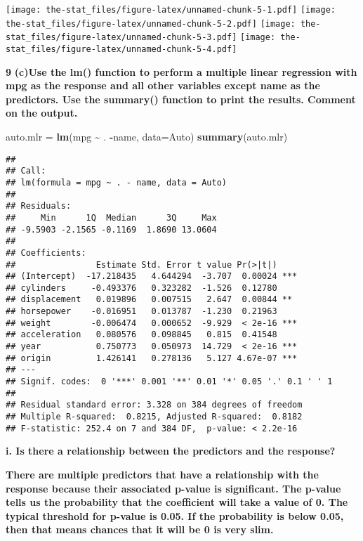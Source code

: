 \documentclass[
]{article}
\newenvironment{Shaded}{\begin{snugshade}}{\end{snugshade}}
\newcommand{\AttributeTok}[1]{\textcolor[rgb]{0.13,0.29,0.53}{#1}}
\newcommand{\FunctionTok}[1]{\textcolor[rgb]{0.13,0.29,0.53}{\textbf{#1}}}
\newcommand{\NormalTok}[1]{#1}
\newcommand{\OtherTok}[1]{\textcolor[rgb]{0.56,0.35,0.01}{#1}}
\newcommand{\SpecialCharTok}[1]{\textcolor[rgb]{0.81,0.36,0.00}{\textbf{#1}}}
\begin{document}
\texttt{[image: the-stat\_files/figure-latex/unnamed-chunk-5-1.pdf]}
\texttt{[image: the-stat\_files/figure-latex/unnamed-chunk-5-2.pdf]}
\texttt{[image: the-stat\_files/figure-latex/unnamed-chunk-5-3.pdf]}
\texttt{[image: the-stat\_files/figure-latex/unnamed-chunk-5-4.pdf]}

\textbf{9} \textbf{(c)Use the lm() function to perform a multiple linear
regression with mpg as the response and all other variables except name
as the predictors. Use the summary() function to print the results.
Comment on the output.}

\begin{Shaded}
\begin{Highlighting}[]
\NormalTok{auto.mlr }\OtherTok{=} \FunctionTok{lm}\NormalTok{(mpg }\SpecialCharTok{\textasciitilde{}}\NormalTok{ . }\SpecialCharTok{{-}}\NormalTok{name, }\AttributeTok{data=}\NormalTok{Auto)}
\FunctionTok{summary}\NormalTok{(auto.mlr)}
\end{Highlighting}
\end{Shaded}

\begin{verbatim}
## 
## Call:
## lm(formula = mpg ~ . - name, data = Auto)
## 
## Residuals:
##     Min      1Q  Median      3Q     Max 
## -9.5903 -2.1565 -0.1169  1.8690 13.0604 
## 
## Coefficients:
##                Estimate Std. Error t value Pr(>|t|)    
## (Intercept)  -17.218435   4.644294  -3.707  0.00024 ***
## cylinders     -0.493376   0.323282  -1.526  0.12780    
## displacement   0.019896   0.007515   2.647  0.00844 ** 
## horsepower    -0.016951   0.013787  -1.230  0.21963    
## weight        -0.006474   0.000652  -9.929  < 2e-16 ***
## acceleration   0.080576   0.098845   0.815  0.41548    
## year           0.750773   0.050973  14.729  < 2e-16 ***
## origin         1.426141   0.278136   5.127 4.67e-07 ***
## ---
## Signif. codes:  0 '***' 0.001 '**' 0.01 '*' 0.05 '.' 0.1 ' ' 1
## 
## Residual standard error: 3.328 on 384 degrees of freedom
## Multiple R-squared:  0.8215, Adjusted R-squared:  0.8182 
## F-statistic: 252.4 on 7 and 384 DF,  p-value: < 2.2e-16
\end{verbatim}

\textbf{i. Is there a relationship between the predictors and the
response?}

\textbf{There are multiple predictors that have a relationship with the
response because their associated p-value is significant. The p-value
tells us the probability that the coefficient will take a value of 0.
The typical threshold for p-value is 0.05. If the probability is below
0.05, then that means chances that it will be 0 is very slim.}
\end{document}
